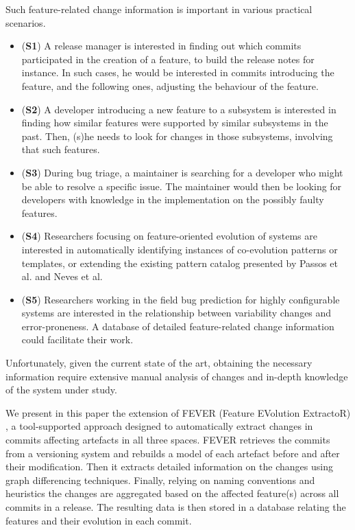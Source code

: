 Such feature-related change information is important in various practical scenarios.
\begin{itemize}
\item (\textbf{S1}) A release manager is interested in finding out which commits participated
in the creation of a feature, to build the release notes for instance. 
In such cases, he would be interested in commits introducing the feature, 
and the following ones, adjusting the behaviour of the feature.
\item (\textbf{S2}) A developer introducing a new feature to a subsystem is interested in finding
how similar features were supported by similar subsystems in the past. Then, (s)he needs to look for
changes in those subsystems, involving that such features.
\item (\textbf{S3}) During bug triage, a maintainer is searching for a developer who
might be able to resolve a specific issue. The maintainer would then 
be looking for developers with knowledge in the implementation on the possibly faulty
features.
\item (\textbf{S4}) Researchers focusing on feature-oriented evolution of systems are interested in 
automatically identifying instances of co-evolution patterns or templates, or extending the existing pattern catalog presented by Passos et al.
\citep{passos_coevolution_2015} and Neves et al. \citep{neves_safe_2015}
\item (\textbf{S5}) Researchers working in the field bug prediction for highly configurable systems are
interested in the relationship between variability changes and error-proneness.
A database of detailed feature-related change information could facilitate their work.
\end{itemize}
Unfortunately, given the current state of the art, obtaining the necessary information require extensive manual analysis of changes
and in-depth knowledge of the system under study.

We present in this paper the extension of FEVER (Feature EVolution ExtractoR) \citep{dintzner_fever:_2016}, 
a tool-supported approach designed to automatically extract changes in commits affecting artefacts in all three spaces.
FEVER retrieves the commits from a versioning system and rebuilds a model of each artefact before and after their modification. 
Then it  extracts detailed information on the changes using graph differencing techniques.
Finally, relying on naming conventions and heuristics the changes are aggregated based on the affected feature(s) across all commits in a release.
The resulting data is then stored in a database relating the features and their evolution in each commit.

